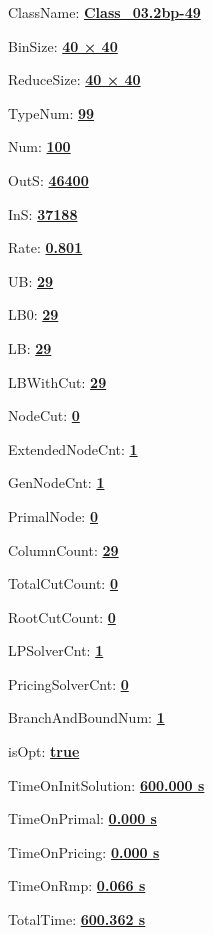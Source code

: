 \documentclass[11pt]{article}
\begin{document}
\pagestyle{empty}


ClassName: \underline{\textbf{Class_03.2bp-49}}
\par
BinSize: \underline{\textbf{40 × 40}}
\par
ReduceSize: \underline{\textbf{40 × 40}}
\par
TypeNum: \underline{\textbf{99}}
\par
Num: \underline{\textbf{100}}
\par
OutS: \underline{\textbf{46400}}
\par
InS: \underline{\textbf{37188}}
\par
Rate: \underline{\textbf{0.801}}
\par
UB: \underline{\textbf{29}}
\par
LB0: \underline{\textbf{29}}
\par
LB: \underline{\textbf{29}}
\par
LBWithCut: \underline{\textbf{29}}
\par
NodeCut: \underline{\textbf{0}}
\par
ExtendedNodeCnt: \underline{\textbf{1}}
\par
GenNodeCnt: \underline{\textbf{1}}
\par
PrimalNode: \underline{\textbf{0}}
\par
ColumnCount: \underline{\textbf{29}}
\par
TotalCutCount: \underline{\textbf{0}}
\par
RootCutCount: \underline{\textbf{0}}
\par
LPSolverCnt: \underline{\textbf{1}}
\par
PricingSolverCnt: \underline{\textbf{0}}
\par
BranchAndBoundNum: \underline{\textbf{1}}
\par
isOpt: \underline{\textbf{true}}
\par
TimeOnInitSolution: \underline{\textbf{600.000 s}}
\par
TimeOnPrimal: \underline{\textbf{0.000 s}}
\par
TimeOnPricing: \underline{\textbf{0.000 s}}
\par
TimeOnRmp: \underline{\textbf{0.066 s}}
\par
TotalTime: \underline{\textbf{600.362 s}}
\par
\newpage


\end{document}
